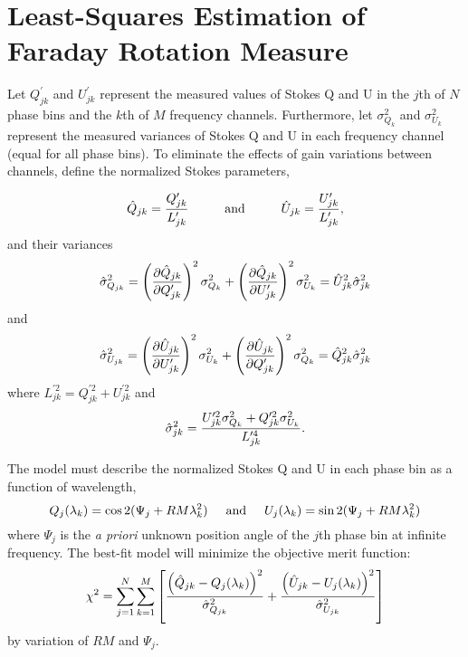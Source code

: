 \documentclass[12pt]{article}
\begin{document}
\section{Least-Squares Estimation of Faraday Rotation Measure}

Let $Q^\prime_{jk}$ and $U^\prime_{jk}$ represent the measured values
of Stokes Q and U in the $j$th of $N$ phase bins and the $k$th of $M$
frequency channels.  Furthermore, let $\sigma^2_{Q_k}$ and
$\sigma^2_{U_k}$ represent the measured variances of Stokes Q and U in
each frequency channel (equal for all phase bins).  To eliminate the
effects of gain variations between channels, define the normalized
Stokes parameters,

\begin{equation}
\hat{Q}_{jk} = { Q^\prime_{jk} \over L^\prime_{jk} }
\hspace{1cm} {\rm and} \hspace{1cm}
\hat{U}_{jk} = { U^\prime_{jk} \over L^\prime_{jk} },
\end{equation}
and their variances
\begin{equation}
\hat{\sigma}^2_{Q_{jk}}
=\left({\partial\hat{Q}_{jk}\over\partial Q^\prime_{jk}}\right)^2\sigma^2_{Q_k}
+\left({\partial\hat{Q}_{jk}\over\partial U^\prime_{jk}}\right)^2\sigma^2_{U_k}
=\hat{U}^2_{jk}\hat{\sigma}^2_{jk}
\end{equation}
and
\begin{equation}
\hat{\sigma}^2_{U_{jk}}
=\left({\partial\hat{U}_{jk}\over\partial U^\prime_{jk}}\right)^2\sigma^2_{U_k}
+\left({\partial\hat{U}_{jk}\over\partial Q^\prime_{jk}}\right)^2\sigma^2_{Q_k}
=\hat{Q}^2_{jk}\hat{\sigma}^2_{jk}
\end{equation}
where $L^{\prime2}_{jk} = Q^{\prime2}_{jk} + U^{\prime2}_{jk}$ and
\begin{equation}
\hat{\sigma}^2_{jk} =
{ U^{\prime2}_{jk}\sigma^2_{Q_k}+Q^{\prime2}_{jk}\sigma^2_{U_k}
 \over L^{\prime4}_{jk} }.
\end{equation}

The model must describe the normalized Stokes Q and U in each phase
bin as a function of wavelength,
\begin{equation}
Q_j(\lambda_k) = \cos 2(\Psi_j + RM \lambda^2_k)
\hspace{5mm} {\rm and} \hspace{5mm}
U_j(\lambda_k) = \sin 2(\Psi_j + RM \lambda^2_k)
\end{equation}
where $\Psi_j$ is the {\it a priori} unknown position angle of the $j$th
phase bin at infinite frequency.  The best-fit model will minimize the
objective merit function:
\begin{equation}
\chi^2 = \sum_{j=1}^N \sum_{k=1}^M \left[
{\left(\hat{Q}_{jk} - Q_j(\lambda_k)\right)^2 \over \hat{\sigma}^2_{Q_{jk}}} +
{\left(\hat{U}_{jk} - U_j(\lambda_k)\right)^2 \over \hat{\sigma}^2_{U_{jk}}}
\right]
\end{equation}
by variation of $RM$ and $\Psi_j$.
\end{document}
